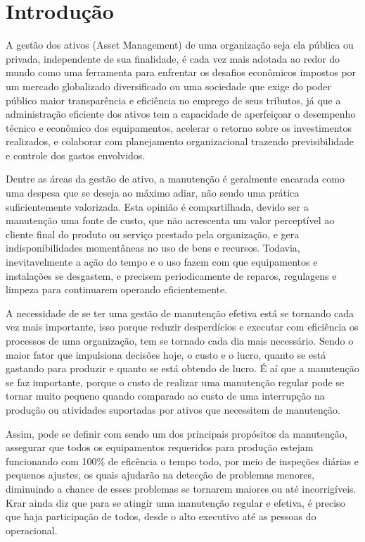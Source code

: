 \chapter{Introdução}
\label{cap-introducao}

A gestão dos ativos (Asset Management) de uma organização seja ela pública ou privada, independente de sua finalidade, é cada vez mais adotada ao redor do mundo como uma ferramenta para enfrentar os desafios econômicos impostos por um mercado globalizado diversificado ou uma sociedade que exige do poder público maior transparência e eficiência no emprego de seus tributos, já que a administração eficiente dos ativos tem a capacidade de aperfeiçoar o desempenho técnico e econômico dos equipamentos, acelerar o retorno sobre os investimentos realizados, e colaborar com planejamento organizacional trazendo previsibilidade e controle dos gastos envolvidos. 

Dentre as áreas da gestão de ativo, a manutenção é geralmente encarada como uma despesa que se deseja ao máximo adiar, não sendo uma prática suficientemente valorizada. Esta opinião é compartilhada, devido ser a manutenção uma fonte de custo, que não acrescenta um valor perceptível ao cliente final do produto ou serviço prestado pela organização, e gera indisponibilidades momentâneas no uso de bens e recursos.
Todavia, inevitavelmente a ação do tempo e o uso fazem com que equipamentos e instalações se desgastem, e precisem periodicamente de reparos, regulagens e limpeza para continuarem operando eficientemente.

A necessidade de se ter uma gestão de manutenção efetiva está se tornando cada vez mais importante, isso porque  reduzir desperdícios e executar com eficiência os processos de uma organização, tem se tornado cada dia mais necessário. Sendo o maior fator que impulsiona decisões hoje, o custo e o lucro, quanto se está gastando para produzir e quanto se está obtendo de lucro. É aí que a manutenção se faz importante, porque o custo de realizar uma manutenção regular pode se tornar muito pequeno quando comparado ao custo de uma interrupção na produção ou atividades suportadas por ativos que necessitem de manutenção.

Assim, pode se definir com sendo um dos principais propósitos da manutenção, assegurar que todos os equipamentos requeridos para produção estejam funcionando com 100\% de eficência o tempo todo, por meio de inspeções diárias e pequenos ajustes, os quais ajudarão na detecção de problemas menores, diminuindo a chance de esses problemas se tornarem maiores ou até incorrigíveis. Krar \cite{krar2009} ainda diz que para se atingir uma manutenção regular e efetiva, é preciso que haja participação de todos, desde o alto executivo até as pessoas do operacional.



